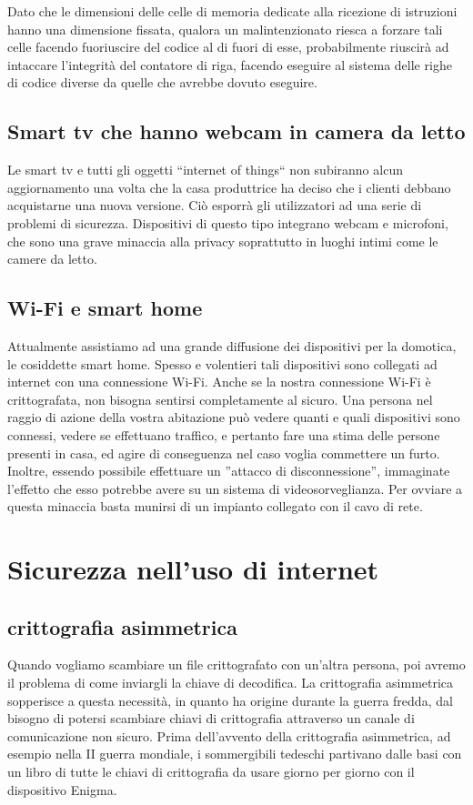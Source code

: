 \documentclass[italian,a4paper,12pt,oneside]{report}
\begin{document}
Dato che le dimensioni delle celle di memoria dedicate alla ricezione di istruzioni
hanno una dimensione fissata, qualora un malintenzionato riesca a forzare tali celle
facendo fuoriuscire del codice al di fuori di esse, probabilmente riuscirà
ad intaccare l'integrità del contatore di riga, facendo eseguire al sistema
delle righe di codice diverse da quelle che avrebbe dovuto eseguire.





\section{Smart tv che hanno webcam in camera da letto}
Le smart tv e tutti gli oggetti ``internet of things`` non subiranno alcun
aggiornamento una volta che la casa produttrice ha deciso che i clienti
debbano acquistarne una nuova versione. Ciò esporrà gli utilizzatori ad
una serie di problemi di sicurezza. Dispositivi di questo tipo integrano
webcam e microfoni, che sono una grave minaccia alla privacy soprattutto in luoghi
intimi come le camere da letto.

\section{Wi-Fi e smart home}
Attualmente assistiamo ad una grande diffusione dei dispositivi per la domotica,
le cosiddette smart home. Spesso e volentieri tali dispositivi sono collegati
ad internet con una connessione Wi-Fi. Anche se la nostra connessione Wi-Fi
è crittografata, non bisogna sentirsi completamente al sicuro.
Una persona nel raggio di azione della vostra abitazione può vedere quanti
e quali dispositivi sono connessi, vedere se effettuano traffico, e pertanto
fare una stima delle persone presenti in casa, ed agire di conseguenza nel
caso voglia commettere un furto. Inoltre, essendo possibile effettuare un
''attacco di disconnessione'', immaginate l'effetto che esso potrebbe avere
su un sistema di videosorveglianza. Per ovviare a questa minaccia basta munirsi
di un impianto collegato con il cavo di rete.



\chapter{Sicurezza nell'uso di internet}

\section{crittografia asimmetrica}
Quando vogliamo scambiare un file crittografato con un'altra persona, poi avremo
il problema di come inviargli la chiave di decodifica.
La crittografia asimmetrica sopperisce a questa necessità, in quanto ha origine
durante la guerra fredda, dal bisogno di potersi scambiare chiavi di
crittografia attraverso un canale di comunicazione non sicuro.
Prima dell'avvento della crittografia asimmetrica, ad esempio nella II
guerra mondiale, i sommergibili tedeschi partivano dalle basi con un libro
di tutte le chiavi di crittografia da usare giorno per giorno con il
dispositivo Enigma.
\end{document}
